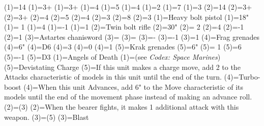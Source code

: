 \renewcommand{\UnitName}{Outrider Squad }%
\renewcommand{\UnitPower}{6}%
\renewcommand{\UnitIcon}{Fast-Attack.svg}%
%
\renewcommand{\StatBlocks}{2}%
\Movement(1)={14}%
\WeaponSkill(1)={3+}%
\BalisticSkill(1)={3+}%
\Strength(1)={4}%
\Toughness(1)={5}%
\Wounds(1)={4}%
\Attacks(1)={2}%
\Leadership(1)={7}%
\Save(1)={3}%
%
\Movement(2)={14}%
\WeaponSkill(2)={3+}%
\BalisticSkill(2)={3+}%
\Strength(2)={4}%
\Toughness(2)={5}%
\Wounds(2)={4}%
\Attacks(2)={3}%
\Leadership(2)={8}%
\Save(2)={3}%
\renewcommand{\UnitText}{2 Outriders and 1 Sergent.  Every model is equiped with: \WeaponName(1); \WeaponName(2); \WeaponName(3); \WeaponName(4); \WeaponName(5).}%
%
\renewcommand{\NumWeapon}{5}%
\WeaponName(1)={Heavy bolt pistol}%
\WeaponRange(1)={18"}%
\WeaponType(1)={ 1}%
\WeaponStrength(1)={4}%
\WeaponAP(1)={-1}%
\WeaponDamage(1)={1}%
%
\WeaponName(2)={Twin bolt rifle}%
\WeaponRange(2)={30"}%
\WeaponType(2)={ 2}%
\WeaponStrength(2)={4}%
\WeaponAP(2)={-1}%
\WeaponDamage(2)={1}%
%
\WeaponName(3)={Astartes chanisword}%
\WeaponRange(3)={}%
\WeaponType(3)={}%
\WeaponStrength(3)={-}%
\WeaponAP(3)={-1}%
\WeaponDamage(3)={1}%
%
\WeaponName(4)={Frag grenades}%
\WeaponRange(4)={6"}%
\WeaponType(4)={D6}%
\WeaponStrength(4)={3}%
\WeaponAP(4)={0}%
\WeaponDamage(4)={1}%
%
\WeaponName(5)={Krak grenades}%
\WeaponRange(5)={6"}%
\WeaponType(5)={ 1}%
\WeaponStrength(5)={6}%
\WeaponAP(5)={-1}%
\WeaponDamage(5)={D3}%
%
\renewcommand{\NumAbilities}{3}%
\AbilityName(1)={Angels of Death}%
\AbilityDescription(1)={(see \textit{Codex: Space Marines})}%
%
\AbilityName(5)={Devistating Charge}%
\AbilityDescription(5)={If this unit makes a charge move, add 2 to the Attacks characteristic of models in this unit until the end of the turn.}%
%
\AbilityName(4)={Turbo-boost}%
\AbilityDescription(4)={When this unit Advances, add 6" to the Move characteristic of its models until the end of the movement phase instead of making an advance roll.}%
%
\AbilityName(2)={\WeaponName(3)}%
\AbilityDescription(2)={When the bearer fights, it makes 1 additional attack with this weapon.}%
%
\AbilityName(3)={\WeaponName(5)}%
\AbilityDescription(3)={Blast}%
%
\renewcommand{\FactionKeywords}{Imperium, Adeptus Astartes, <Chapter>}%
\renewcommand{\Keywords}{Infantry, Primaris, Outrider Squad}%
%
\newcommand{\ExtraFrontTitle}{\AbilityName(5)}%
\renewcommand{\ExtraFrontText}{\AbilityDescription(5)}%
\newcommand{\ExtraBackTitle}{\AbilityName(4)}%
\renewcommand{\ExtraBackText}{\AbilityDescription(4)}%
\endinput%